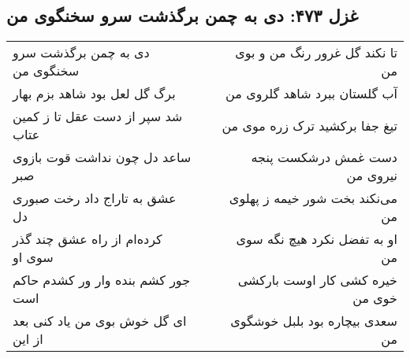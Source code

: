 \begin{center}
\section*{غزل ۴۷۳: دی به چمن برگذشت سرو سخنگوی من}
\label{sec:473}
\begin{longtable}{l p{0.5cm} r}
دی به چمن برگذشت سرو سخنگوی من
&&
تا نکند گل غرور رنگ من و بوی من
\\
برگ گل لعل بود شاهد بزم بهار
&&
آب گلستان ببرد شاهد گلروی من
\\
شد سپر از دست عقل تا ز کمین عتاب
&&
تیغ جفا برکشید ترک زره موی من
\\
ساعد دل چون نداشت قوت بازوی صبر
&&
دست غمش درشکست پنجه نیروی من
\\
عشق به تاراج داد رخت صبوری دل
&&
می‌نکند بخت شور خیمه ز پهلوی من
\\
کرده‌ام از راه عشق چند گذر سوی او
&&
او به تفضل نکرد هیچ نگه سوی من
\\
جور کشم بنده وار ور کشدم حاکم است
&&
خیره کشی کار اوست بارکشی خوی من
\\
ای گل خوش بوی من یاد کنی بعد از این
&&
سعدی بیچاره بود بلبل خوشگوی من
\\
\end{longtable}
\end{center}
